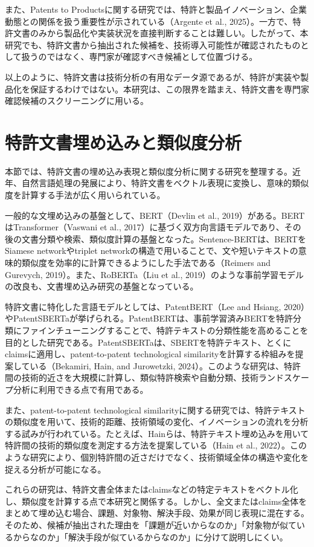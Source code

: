 また、Patents to Productsに関する研究では、特許と製品イノベーション、企業動態との関係を扱う重要性が示されている（Argente et al., 2025）。一方で、特許文書のみから製品化や実装状況を直接判断することは難しい。したがって、本研究でも、特許文書から抽出された候補を、技術導入可能性が確認されたものとして扱うのではなく、専門家が確認すべき候補として位置づける。

以上のように、特許文書は技術分析の有用なデータ源であるが、特許が実装や製品化を保証するわけではない。本研究は、この限界を踏まえ、特許文書を専門家確認候補のスクリーニングに用いる。

\section{特許文書埋め込みと類似度分析}

本節では、特許文書の埋め込み表現と類似度分析に関する研究を整理する。近年、自然言語処理の発展により、特許文書をベクトル表現に変換し、意味的類似度を計算する手法が広く用いられている。

一般的な文埋め込みの基盤として、BERT（Devlin et al., 2019）がある。BERTはTransformer（Vaswani et al., 2017）に基づく双方向言語モデルであり、その後の文書分類や検索、類似度計算の基盤となった。Sentence-BERTは、BERTをSiamese networkやtriplet networkの構造で用いることで、文や短いテキストの意味的類似度を効率的に計算できるようにした手法である（Reimers and Gurevych, 2019）。また、RoBERTa（Liu et al., 2019）のような事前学習モデルの改良も、文書埋め込み研究の基盤となっている。

特許文書に特化した言語モデルとしては、PatentBERT（Lee and Hsiang, 2020）やPatentSBERTaが挙げられる。PatentBERTは、事前学習済みBERTを特許分類にファインチューニングすることで、特許テキストの分類性能を高めることを目的とした研究である。PatentSBERTaは、SBERTを特許テキスト、とくにclaimsに適用し、patent-to-patent technological similarityを計算する枠組みを提案している（Bekamiri, Hain, and Jurowetzki, 2024）。このような研究は、特許間の技術的近さを大規模に計算し、類似特許検索や自動分類、技術ランドスケープ分析に利用できる点で有用である。

また、patent-to-patent technological similarityに関する研究では、特許テキストの類似度を用いて、技術的距離、技術領域の変化、イノベーションの流れを分析する試みが行われている。たとえば、Hainらは、特許テキスト埋め込みを用いて特許間の技術的類似度を測定する方法を提案している（Hain et al., 2022）。このような研究により、個別特許間の近さだけでなく、技術領域全体の構造や変化を捉える分析が可能になる。

これらの研究は、特許文書全体またはclaimsなどの特定テキストをベクトル化し、類似度を計算する点で本研究と関係する。しかし、全文またはclaims全体をまとめて埋め込む場合、課題、対象物、解決手段、効果が同じ表現に混在する。そのため、候補が抽出された理由を「課題が近いからなのか」「対象物が似ているからなのか」「解決手段が似ているからなのか」に分けて説明しにくい。

